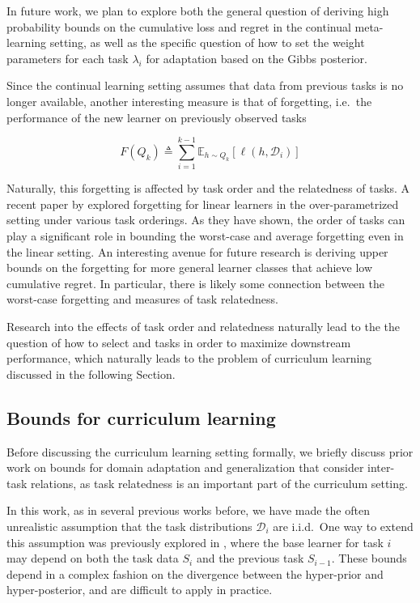 \documentclass{article}
\theoremstyle{definition}
\newcommand{\Expect}[2]{\mathbb{E}_{#1}\left [#2 \right ]}
\begin{document}
In future work, we plan to explore both the general question of deriving high probability bounds on the cumulative loss and regret in the continual meta-learning setting, as well as the specific question of how to set the weight parameters for each task $\lambda_i$ for adaptation based on the Gibbs posterior. 

Since the continual learning setting assumes that data from previous tasks is no longer available, another interesting measure is that of forgetting, i.e.\ the performance of the new learner on previously observed tasks

$$F(Q_k)\triangleq \sum_{i=1}^{k-1}\Expect{h\sim Q_k}{\ell(h, \mathcal{D}_i)}$$

Naturally, this forgetting is affected by task order and the relatedness of tasks.
A recent paper by \citet{Evron2022} explored forgetting for linear learners in the over-parametrized setting under various task orderings. 
As they have shown, the order of tasks can play a significant role in bounding the worst-case and average forgetting even in the linear setting.
An interesting avenue for future research is deriving upper bounds on the forgetting for more general learner classes that achieve low cumulative regret. In particular, there is likely some connection between the worst-case forgetting and measures of task relatedness.

Research into the effects of task order and relatedness naturally lead to the the question of how to select and tasks in order to maximize downstream performance, which naturally leads to the problem of curriculum learning discussed in the following Section.

\subsection{Bounds for curriculum learning} 

Before discussing the curriculum learning setting formally, we briefly discuss prior work on bounds for domain adaptation and generalization that consider inter-task relations, as task relatedness is an important part of the curriculum setting.

In this work, as in several previous works \citep{Amit2018, Rothfuss2020, Farid2021} before, we have made the often unrealistic assumption that the task distributions $\mathcal{D}_i$ are i.i.d.\
One way to extend this assumption was previously explored in \citet{Pentina2015a}, where the base learner for task $i$ may depend on both the task data $S_i$ and the previous task $S_{i-1}$. These bounds depend in a complex fashion on the divergence between the hyper-prior and hyper-posterior, and are difficult to apply in practice.
\end{document}
